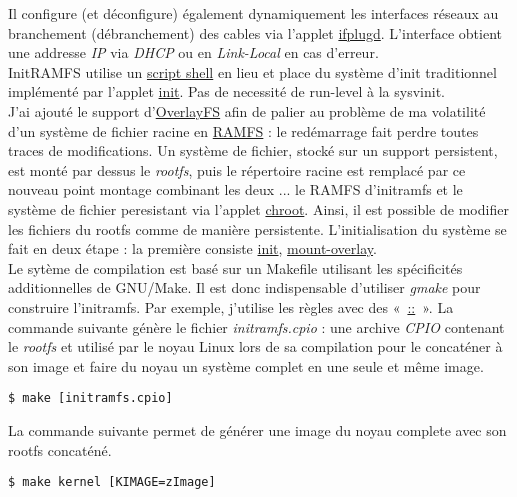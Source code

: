 \documentclass[a4paper]{article}
\begin{document}
Il configure (et déconfigure) également dynamiquement les interfaces réseaux au branchement (débranchement) des cables via l'applet \href{http://www.busybox.net/downloads/BusyBox.html#ifplugd}{ifplugd}. L'interface obtient une addresse \textit{IP} via \textit{DHCP} ou en \textit{Link-Local} en cas d'erreur.\\

InitRAMFS utilise un \href{https://github.com/gazoo74/initramfs/blob/master/packages-initramfs/ramfs/etc/init}{script shell} en lieu et place du système d'init traditionnel implémenté par l'applet \href{http://www.busybox.net/downloads/BusyBox.html#init}{init}. Pas de necessité de run-level à la sysvinit.\\

J'ai ajouté le support d'\href{https://www.kernel.org/doc/Documentation/filesystems/overlayfs.txt}{OverlayFS} afin de palier au problème de ma volatilité d'un système de fichier racine en \href{https://fr.wikipedia.org/wiki/Ramfs}{RAMFS} : le redémarrage fait perdre toutes traces de modifications. Un système de fichier, stocké sur un support persistent, est monté par dessus le \textit{rootfs}, puis le répertoire racine est remplacé par ce nouveau point montage combinant les deux ... le RAMFS d'initramfs et le système de fichier peresistant via l'applet \href{http://www.busybox.net/downloads/BusyBox.html##chroot}{chroot}. Ainsi, il est possible de modifier les fichiers du rootfs comme de manière persistente. L'initialisation du système se fait en deux étape : la première consiste
\href{https://github.com/gazoo74/initramfs/blob/master/packages-initramfs/overlay/init}{init}, \href{https://github.com/gazoo74/initramfs/blob/master/packages-initramfs/overlay/etc/init.d/mount-overlay}{mount-overlay}.\\

Le sytème de compilation est basé sur un Makefile utilisant les spécificités additionnelles de GNU/Make. Il est donc indispensable d'utiliser \textit{gmake} pour construire l'initramfs. Par exemple, j'utilise les règles avec des «~\href{https://www.gnu.org/software/make/manual/html_node/Double_002dColon.html}{::}~».
La commande suivante génère le fichier \textit{initramfs.cpio} : une archive \textit{CPIO} contenant le \textit{rootfs} et utilisé par le noyau Linux lors de sa compilation pour le concaténer à son image et faire du noyau un système complet en une seule et même image.
\begin{verbatim}
$ make [initramfs.cpio]
\end{verbatim}
La commande suivante permet de générer une image du noyau complete avec son rootfs concaténé.
\begin{verbatim}
$ make kernel [KIMAGE=zImage]
\end{verbatim}
\end{document}
